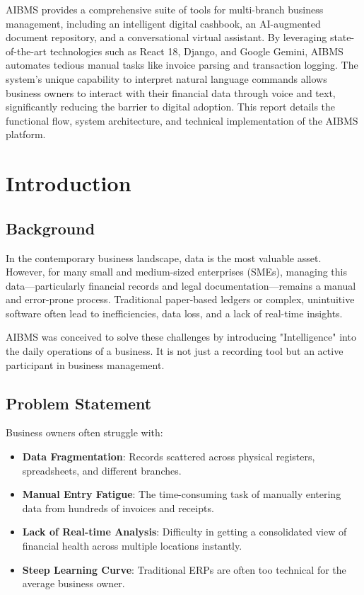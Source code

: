 \documentclass[12pt,a4paper]{report}
\begin{document}
AIBMS provides a comprehensive suite of tools for multi-branch business management, including an intelligent digital cashbook, an AI-augmented document repository, and a conversational virtual assistant. By leveraging state-of-the-art technologies such as React 18, Django, and Google Gemini, AIBMS automates tedious manual tasks like invoice parsing and transaction logging. The system's unique capability to interpret natural language commands allows business owners to interact with their financial data through voice and text, significantly reducing the barrier to digital adoption. This report details the functional flow, system architecture, and technical implementation of the AIBMS platform.

\tableofcontents

\chapter{Introduction}
\section{Background}
In the contemporary business landscape, data is the most valuable asset. However, for many small and medium-sized enterprises (SMEs), managing this data—particularly financial records and legal documentation—remains a manual and error-prone process. Traditional paper-based ledgers or complex, unintuitive software often lead to inefficiencies, data loss, and a lack of real-time insights.

AIBMS was conceived to solve these challenges by introducing "Intelligence" into the daily operations of a business. It is not just a recording tool but an active participant in business management.

\section{Problem Statement}
Business owners often struggle with:
\begin{itemize}
    \item \textbf{Data Fragmentation}: Records scattered across physical registers, spreadsheets, and different branches.
    \item \textbf{Manual Entry Fatigue}: The time-consuming task of manually entering data from hundreds of invoices and receipts.
    \item \textbf{Lack of Real-time Analysis}: Difficulty in getting a consolidated view of financial health across multiple locations instantly.
    \item \textbf{Steep Learning Curve}: Traditional ERPs are often too technical for the average business owner.
\end{itemize}
\end{document}
